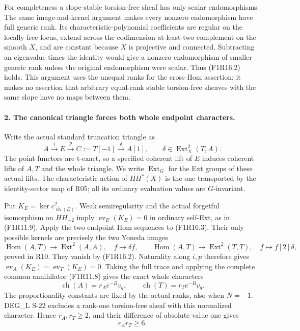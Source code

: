 For completeness a slope-stable torsion-free sheaf has
only scalar endomorphisms. The same image-and-kernel
argument makes every nonzero endomorphism have full
generic rank. Its characteristic-polynomial coefficients
are regular on the locally free locus, extend across the
codimension-at-least-two complement on the smooth $X$,
and are constant because $X$ is projective and connected.
Subtracting an eigenvalue times the identity would give
a nonzero endomorphism of smaller generic rank unless
the original endomorphism were scalar. Thus (F1R16.2)
holds. This argument uses the unequal ranks for the
cross-Hom assertion; it makes no assertion that arbitrary
equal-rank stable torsion-free sheaves with the same slope
have no maps between them.

\paragraph{2. The canonical triangle forces both whole endpoint characters.}
Write the actual standard truncation triangle as
\[
 A\xrightarrow{i} E\xrightarrow{p} C:=T[-1]
       \xrightarrow{\delta} A[1],\qquad
       \delta\in\operatorname{Ext}^2_X(T,A).
 \tag{F1R16.3}
\]
The point functors are t-exact, so a specified coherent
lift of $E$ induces coherent lifts of $A,T$ and the whole
triangle. We write $\operatorname{Ext}_G$ for the Ext
groups of these actual lifts. The characteristic action
of $HH^*(X)$ is the one transported by the identity-sector
map of R05; all its ordinary evaluation values are
$G$-invariant.

Put $K_E=\ker c^2_{\operatorname{ch}(E)}$. Weak
semiregularity and the actual forgetful isomorphism on
$HH_{-2}$ imply
$\operatorname{ev}_E(K_E)=0$ in ordinary self-Ext, as
in (F1R11.9). Apply the two endpoint Hom sequences to
(F1R16.3). Their only possible kernels are precisely
the two Yoneda images
\[
 \operatorname{Hom}(A,T)\longrightarrow
 \operatorname{Ext}^2(A,A),\quad f\longmapsto\delta f,
 \qquad
 \operatorname{Hom}(A,T)\longrightarrow
 \operatorname{Ext}^2(T,T),\quad f\longmapsto f[2]\delta,
 \tag{F1R16.4}
\]
proved in R10. They vanish by (F1R16.2). Naturality along
$i,p$ therefore gives
$\operatorname{ev}_A(K_E)=\operatorname{ev}_T(K_E)=0$.
Taking the full trace and applying the complete common
annihilator (F1R11.8) gives the exact whole characters
\[
        \operatorname{ch}(A)=r_Ae^{-B}v_q,
        \qquad
        \operatorname{ch}(T)=r_Te^{-B}v_q.
 \tag{F1R16.5}
\]
The proportionality constants are fixed by the actual
ranks, also when $N=-1$. DEG\_L S-22 excludes a rank-one
torsion-free sheaf with this normalized character. Hence
$r_A,r_T\ge2$, and their difference of absolute value
one gives
\[
                            r_A r_T\ge6.
 \tag{F1R16.6}
\]

